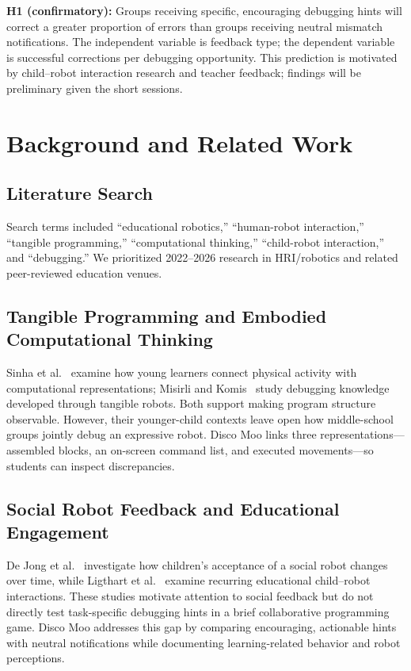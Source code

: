 \documentclass[conference,12pt,letterpaper]{IEEEtran}
\begin{document}
\textbf{H1 (confirmatory):} Groups receiving specific, encouraging debugging hints will correct a greater proportion of errors than groups receiving neutral mismatch notifications. The independent variable is feedback type; the dependent variable is successful corrections per debugging opportunity. This prediction is motivated by child--robot interaction research and teacher feedback; findings will be preliminary given the short sessions.

\section{Background and Related Work}

\subsection{Literature Search}

Search terms included ``educational robotics,'' ``human-robot interaction,'' ``tangible programming,'' ``computational thinking,'' ``child-robot interaction,'' and ``debugging.'' We prioritized 2022--2026 research in HRI/robotics and related peer-reviewed education venues.

\subsection{Tangible Programming and Embodied Computational Thinking}

Sinha et al.~\cite{paper1} examine how young learners connect physical activity with computational representations; Misirli and Komis~\cite{paper4} study debugging knowledge developed through tangible robots. Both support making program structure observable. However, their younger-child contexts leave open how middle-school groups jointly debug an expressive robot. Disco Moo links three representations---assembled blocks, an on-screen command list, and executed movements---so students can inspect discrepancies.

\subsection{Social Robot Feedback and Educational Engagement}

De Jong et al.~\cite{paper2} investigate how children's acceptance of a social robot changes over time, while Ligthart et al.~\cite{paper3} examine recurring educational child--robot interactions. These studies motivate attention to social feedback but do not directly test task-specific debugging hints in a brief collaborative programming game. Disco Moo addresses this gap by comparing encouraging, actionable hints with neutral notifications while documenting learning-related behavior and robot perceptions.
\end{document}
